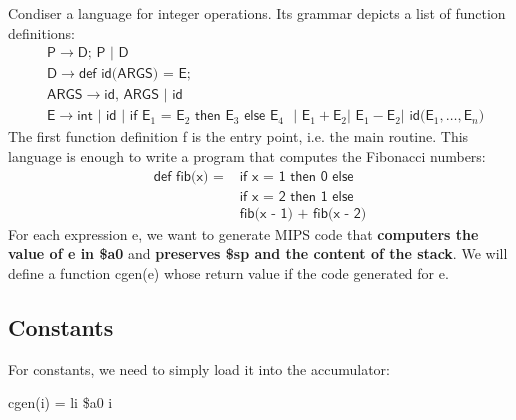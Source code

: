 Condiser a language for integer operations. Its grammar depicts a list of function definitions:
\begin{equation*}\begin{split}
&\textsf{P}\rightarrow\textsf{D; P } | \textsf{ D}\\
&\textsf{D}\rightarrow\textsf{def id(ARGS) = E};\\
&\textsf{ARGS}\rightarrow\textsf{id, ARGS }|\textsf{ id}\\
&\textsf{E}\rightarrow\textsf{int }|\textsf{ id }|\textsf{ if E$_1$ = E$_2$ then E$_3$ else E$_4$ } | \textsf{ E}_1+\textsf{E}_2 | \textsf{ E}_1 - \textsf{E}_2 | \textsf{ id(E$_1,\dots,$E$_n$)}
\end{split}\end{equation*}
The first function definition \textsf{f} is the entry point, i.e. the \textsf{main} routine. This language is enough to write a program that computes the Fibonacci numbers:
\begin{equation*}\begin{split}
\textsf{def fib(x) = }&\textsf{if x = 1 then 0 else}\\
&\textsf{if x = 2 then 1 else}\\
&\textsf{fib(x - 1) + fib(x - 2)}
\end{split}\end{equation*}
For each expression \textsf{e}, we want to generate MIPS code that \textbf{computers the value of \textsf{e} in \$a0} and \textbf{preserves \$sp and the content of the stack}. We will define a function \textsf{cgen(e)} whose return value if the code generated for \textsf{e}.

\subsection{Constants}
For constants, we need to simply load it into the accumulator:
\begin{center}
\textsf{\color{red}cgen(i)}\textsf{ = li \$a0 i}
\end{center}
